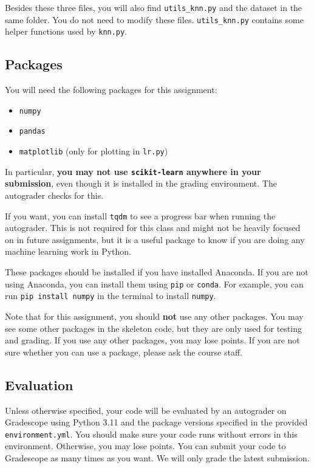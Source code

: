 \documentclass{article}
\begin{document}
Besides these three files, you will also find \verb|utils_knn.py| and the dataset  in the same folder. You do not need to
modify these files. \verb|utils_knn.py| contains some helper functions used by \verb|knn.py|.
\subsection*{Packages}
You will need the following packages for this assignment:
\begin{itemize}
    \item \verb|numpy|
    \item \verb|pandas|
    \item \verb|matplotlib| (only for plotting in \verb|lr.py|)
\end{itemize}

In particular, \textbf{you may not use \texttt{scikit-learn} anywhere in your submission}, even though it is installed in the grading environment. The autograder checks for this.

If you want, you can install \verb|tqdm| to see a progress bar when running the autograder. This is not
required for this class and might not be heavily focused on in future assignments, but it is a useful
package to know if you are doing any machine learning work in Python.

These packages should be installed if you have installed Anaconda. If you are not using Anaconda,
you can install them using \verb|pip| or \verb|conda|. For example, you can run \verb|pip install numpy| in the terminal to
install \verb|numpy|.

Note that for this assignment, you should \textbf{not} use any other packages. You may see some other
packages in the skeleton code, but they are only used for testing and grading. If you use any other
packages, you may lose points. If you are not sure whether you can use a package, please ask the
course staff.
\subsection*{Evaluation}
Unless otherwise specified, your code will be evaluated by an autograder on Gradescope using Python 3.11 and the package versions specified in the provided \texttt{environment.yml}. You should make sure your code runs without errors in this environment. Otherwise, you may lose points. You can submit your code to Gradescope as many times as you want. We will only grade the latest submission.
\end{document}
